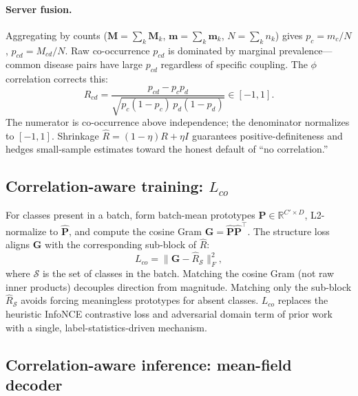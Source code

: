\documentclass[10pt,twocolumn,letterpaper]{article}
\theoremstyle{definition}
\newcommand{\Rhat}{\widehat{R}}
\begin{document}
\paragraph{Server fusion.} Aggregating by counts ($\mathbf{M}{=}\sum_k\mathbf{M}_k$, $\mathbf{m}{=}\sum_k\mathbf{m}_k$, $N{=}\sum_k n_k$) gives $p_c{=}m_c/N$, $p_{cd}{=}M_{cd}/N$. Raw co-occurrence $p_{cd}$ is dominated by marginal prevalence---common disease pairs have large $p_{cd}$ regardless of specific coupling. The $\phi$ correlation corrects this:
\begin{equation}
R_{cd}=\frac{p_{cd}-p_c p_d}{\sqrt{p_c(1-p_c)\,p_d(1-p_d)}}\in[-1,1].
\label{eq:phi}
\end{equation}
The numerator is co-occurrence above independence; the denominator normalizes to $[-1,1]$. Shrinkage $\Rhat=(1-\eta)R+\eta I$ guarantees positive-definiteness and hedges small-sample estimates toward the honest default of ``no correlation.''

\subsection{Correlation-aware training: $L_{co}$}
\label{sec:lco}

For classes present in a batch, form batch-mean prototypes $\mathbf{P}{\in}\mathbb{R}^{C'\times D}$, L2-normalize to $\hat{\mathbf{P}}$, and compute the cosine Gram $\mathbf{G}{=}\hat{\mathbf{P}}\hat{\mathbf{P}}^{\top}$. The structure loss aligns $\mathbf{G}$ with the corresponding sub-block of $\Rhat$:
\begin{equation}
L_{co}=\big\|\mathbf{G}-\Rhat_{\mathcal{S}}\big\|_F^{2},
\label{eq:lco}
\end{equation}
where $\mathcal{S}$ is the set of classes in the batch. Matching the cosine Gram (not raw inner products) decouples direction from magnitude. Matching only the sub-block $\Rhat_{\mathcal{S}}$ avoids forcing meaningless prototypes for absent classes. $L_{co}$ replaces the heuristic InfoNCE contrastive loss and adversarial domain term of prior work with a single, label-statistics-driven mechanism.

\subsection{Correlation-aware inference: mean-field decoder}
\label{sec:decoder}
\end{document}
